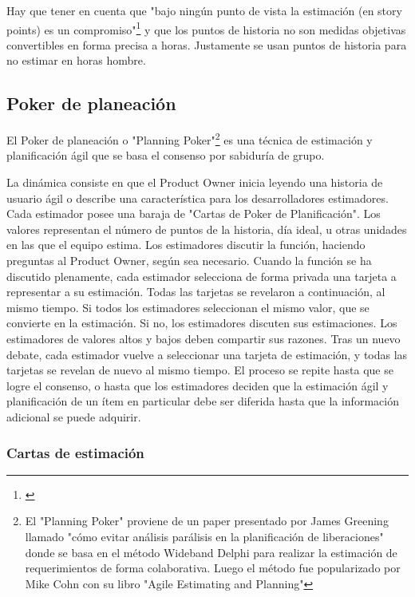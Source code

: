 Hay que tener en cuenta que "bajo ningún punto de vista la estimación (en story points) es un compromiso"\footnote{\cite{UNTREF-2014}} y que los puntos de historia no son medidas objetivas convertibles en forma precisa a horas. Justamente se usan puntos de historia para no estimar en horas hombre.

\subsection{Poker de planeación}

El Poker de planeación o "Planning Poker"\footnote{El "Planning Poker" proviene de un paper presentado por James Greening llamado "cómo evitar análisis parálisis en la planificación de liberaciones"\cite{James-Grenning-2002} donde se basa en el método Wideband Delphi para realizar la estimación de requerimientos de forma colaborativa. Luego el método fue popularizado por Mike Cohn con su libro "Agile Estimating and Planning"\cite{Cohn-2005}} es una técnica de estimación y planificación ágil que se basa el consenso por sabiduría de grupo. 

La dinámica consiste en que el Product Owner inicia leyendo una historia de usuario ágil o describe una característica para los desarrolladores estimadores. Cada estimador posee una baraja de "Cartas de Poker de Planificación". Los valores representan el número de puntos de la historia, día ideal, u otras unidades en las que el equipo estima. Los estimadores discutir la función, haciendo preguntas al Product Owner, según sea necesario. Cuando la función se ha discutido plenamente, cada estimador selecciona de forma privada una tarjeta a representar a su estimación. Todas las tarjetas se revelaron a continuación, al mismo tiempo. Si todos los estimadores seleccionan el mismo valor, que se convierte en la estimación. Si no, los estimadores discuten sus estimaciones. Los estimadores de valores altos y bajos deben compartir sus razones. Tras un nuevo debate, cada estimador vuelve a seleccionar una tarjeta de estimación, y todas las tarjetas se revelan de nuevo al mismo tiempo. El proceso se repite hasta que se logre el consenso, o hasta que los estimadores deciden que la estimación ágil y planificación de un ítem en particular debe ser diferida hasta que la información adicional se puede adquirir.


\subsubsection{Cartas de estimación}

